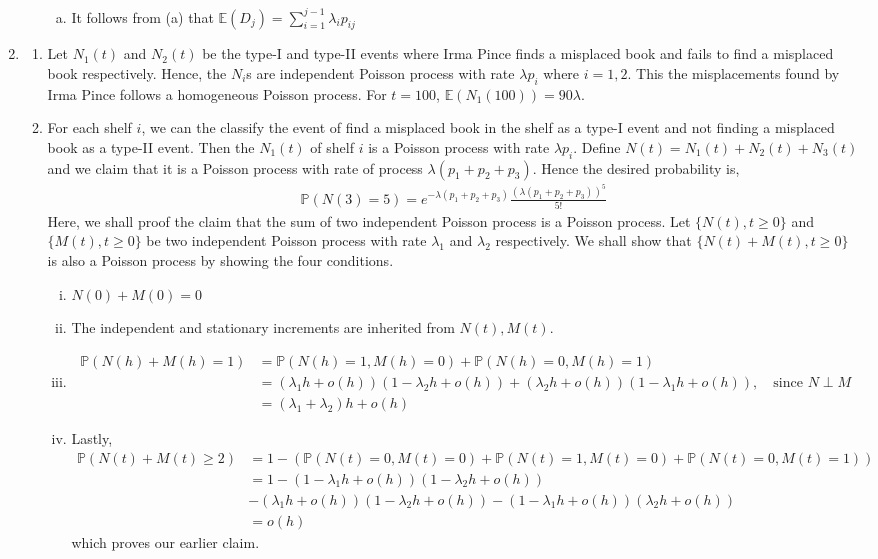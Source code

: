 \documentclass[a4paper,10pt]{article}
\theoremstyle{definition}
\begin{document}
\begin{enumerate}
\begin{enumerate}[(i)]
\begin{enumerate}[(a)]
\item It follows from (a) that $\mathbb{E}(D_j)=\sum_{i=1}^{j-1}\lambda_ip_{ij}$
\end{enumerate}

\end{enumerate}

\item
\begin{enumerate}
\item Let $N_1(t)$ and $N_2(t)$ be the type-I and type-II events where Irma Pince finds a misplaced book and fails to find a misplaced book respectively. Hence, the $N_i$s are independent Poisson process with rate $\lambda p_i$ where $i=1,2$. This the misplacements found by Irma Pince follows a homogeneous Poisson process. For $t=100$, $\mathbb{E}(N_1(100))=90 \lambda$.
\item For each shelf $i$, we can the classify the event of find a misplaced book in the shelf as a type-I event and not finding a misplaced book as a type-II event. Then the $N_1(t)$ of shelf $i$ is a Poisson process with rate $\lambda p_i$. Define $N(t)=N_1(t)+N_2(t)+N_3(t)$ and we claim that it is a Poisson process with rate of process $\lambda(p_1+p_2+p_3)$. Hence the desired probability is,
\begin{align*}
\mathbb{P}(N(3)=5)=e^{-\lambda(p_1+p_2+p_3)}\frac{(\lambda(p_1+p_2+p_3))^5}{5!}
\end{align*}
Here, we shall proof the claim that the sum of two independent Poisson process is a Poisson process. Let $\{N(t), t\geq 0\}$ and $\{M(t), t\geq 0\}$ be two independent Poisson process with rate $\lambda_1$ and $\lambda_2$ respectively. We shall show that $\{N(t)+M(t), t\geq 0\}$ is also a Poisson process by showing the four conditions.
\begin{enumerate}[(i)]
\item $N(0)+M(0)=0$
\item The independent and stationary increments are inherited from $N(t), M(t)$.
\item 
\begin{align*}
\mathbb{P}(N(h)+M(h)=1)&=\mathbb{P}(N(h)=1,M(h)=0)+\mathbb{P}(N(h)=0,M(h)=1)\\
&=(\lambda_1h+o(h))(1-\lambda_2h+o(h))+(\lambda_2h+o(h))(1-\lambda_1h+o(h)),\quad \text{since $N \perp M$}\\
&=(\lambda_1+\lambda_2)h+o(h)
\end{align*}
\item Lastly,
\begin{align*}
\mathbb{P}(N(t)+M(t)\geq 2)&= 1- (\mathbb{P}(N(t)=0,M(t)=0)+\mathbb{P}(N(t)=1,M(t)=0)+\mathbb{P}(N(t)=0,M(t)=1))\\
&= 1- (1-\lambda_1h+o(h))(1-\lambda_2h+o(h))\\
&-(\lambda_1h+o(h))(1-\lambda_2h+o(h))-(1-\lambda_1h+o(h))(\lambda_2h+o(h))\\
&=o(h)
\end{align*}
which proves our earlier claim.
\end{enumerate}


\end{enumerate}
\end{enumerate}
\end{document}

